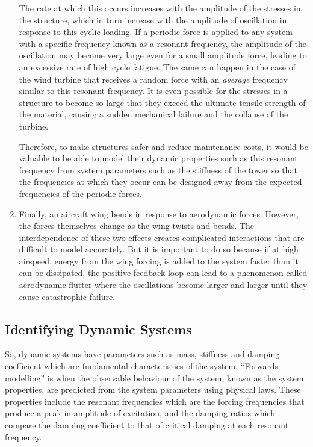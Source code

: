 \documentclass[12pt]{article}
\begin{document}
\begin{enumerate}[listparindent=\parindent]
        The rate at which this occurs increases with the amplitude of the stresses in the structure, which in turn increase with the amplitude of oscillation in response to this cyclic loading.
        If a periodic force is applied to any system with a specific frequency known as a resonant frequency, the amplitude of the oscillation may become very large even for a small amplitude force, leading to an excessive rate of high cycle fatigue.
        The same can happen in the case of the wind turbine that receives a random force with an \textit{average} frequency similar to this resonant frequency.
        It is even possible for the stresses in a structure to become so large that they exceed the ultimate tensile strength of the material, causing a sudden mechanical failure and the collapse of the turbine.

        Therefore, to make structures safer and reduce maintenance costs, it would be valuable to be able to model their dynamic properties such as this resonant frequency from system parameters such as the stiffness of the tower so that the frequencies at which they occur can be designed away from the expected frequencies of the periodic forces.

        \item Finally, an aircraft wing bends in response to aerodynamic forces.
        However, the forces themselves change as the wing twists and bends.
        The interdependence of these two effects creates complicated interactions that are difficult to model accurately.
        But it is important to do so because if at high airspeed, energy from the wing forcing is added to the system faster than it can be dissipated, the positive feedback loop can lead to a phenomenon called aerodynamic flutter where the oscillations become larger and larger until they cause catastrophic failure.
    \end{enumerate}

    \subsection{Identifying Dynamic Systems}

    So, dynamic systems have parameters such as mass, stiffness and damping coefficient which are fundamental characteristics of the system.
    ``Forwards modelling'' is when the observable behaviour of the system, known as the system properties, are predicted from the system parameters using physical laws.
    These properties include the resonant frequencies which are the forcing frequencies that produce a peak in amplitude of excitation, and the damping ratios which compare the damping coefficient to that of critical damping at each resonant frequency.
\end{document}
